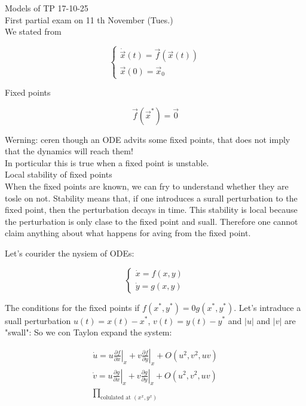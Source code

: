 \documentclass[10pt]{article}
\begin{document}
Models of TP 17-10-25\\
First partial exam on 11 th November (Tues.)\\
We stated from

\[
\left\{\begin{array}{l}
\dot{\vec{x}}(t)=\vec{f}(\vec{x}(t))  \tag{1}\\
\vec{x}(0)=\vec{x}_{0}
\end{array}\right.
\]

Fixed points


\begin{equation*}
\vec{f}\left(\vec{x}^{*}\right)=\overrightarrow{0} \tag{3}
\end{equation*}


Werning: ceren though an ODE advits some fixed points, that does not imply that the dynamics will reach them!\\
In porticular this is true when a fixed point is unstable.\\
Local stability of fixed points\\
When the fixed points are known, we can fry to understand whether they are tosle on not. Stability means that, if one introduces a surall perturbation to the fixed point, then the perturbation decays in time. This stability is local because the perturbation is only clase to the fixed point and suall. Therefore one cannot claim anything about what happens for aving from the fixed point.

Let's courider the nysiem of ODEs:

$$
\left\{\begin{array}{l}
\dot{x}=f(x, y) \\
\dot{y}=g(x, y)
\end{array}\right.
$$

The conditions for the fixed points if $f\left(x^{*}, y^{*}\right)=0 g\left(x^{*}, y^{*}\right)$. Let's intraduce a suall perturbation $u(t)=x(t)-x^{*}$, $v(t)=y(t)-y^{*}$ and $|u|$ and $|v|$ are "swall": So we con Taylon expand the system:

$$
\begin{gathered}
\dot{u}=\left.u \frac{\partial f}{\partial x}\right|_{x}+\left.v \frac{\partial f}{\partial y}\right|_{x}+O\left(u^{2}, v^{2}, u v\right) \\
\dot{v}=\left.u \frac{\partial g}{\partial x}\right|_{x}+\left.v \frac{\partial g}{\partial y}\right|_{x}+O\left(u^{2}, v^{2}, u v\right) \\
\prod_{\text {colulated at }\left(x^{x}, y^{x}\right)}
\end{gathered}
$$
\end{document}
